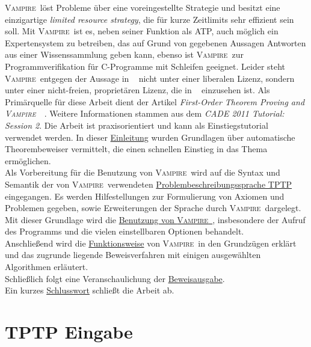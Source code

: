 \documentclass{article}
\newcommand{\vampire}{\textsc{Vampire}~}
\begin{document}
\vampire löst Probleme über eine voreingestellte Strategie und besitzt eine einzigartige \textit{limited resource strategy}, die für kurze Zeitlimits sehr effizient sein soll. Mit \vampire ist es, neben seiner Funktion als ATP, auch möglich ein Expertensystem zu betreiben, das auf Grund von gegebenen Aussagen Antworten aus einer Wissenssammlung geben kann, ebenso ist \vampire zur Programmverifikation für C-Programme mit Schleifen geeignet. 
Leider steht \vampire entgegen der Aussage in ~\cite{cav2013} nicht unter einer liberalen Lizenz, sondern unter einer nicht-freien, proprietären Lizenz, die in ~\cite{vampirehp} einzusehen ist.
Als Primärquelle für diese Arbeit dient der Artikel \textit{First-Order Theorem Proving and \vampire}~\cite{cav2013}.
Weitere Informationen stammen aus dem \textit{CADE 2011 Tutorial: Session 2}.
Die Arbeit ist praxisorientiert und kann als Einstiegstutorial verwendet werden.
In dieser \hyperref[sec:introduction]{Einleitung} wurden Grundlagen über automatische Theorembeweiser vermittelt, die einen schnellen Einstieg in das Thema ermöglichen.\\
Als Vorbereitung für die Benutzung von \vampire wird auf die Syntax und Semantik der von \vampire verwendeten \hyperref[sec:input]{Problembeschreibungssprache TPTP} eingegangen. Es werden Hilfestellungen zur Formulierung von Axiomen und Problemen gegeben, sowie Erweiterungen der Sprache durch \vampire dargelegt.
Mit dieser Grundlage wird die \hyperref[sec:invocation]{Benutzung von \vampire}, insbesondere der Aufruf des Programms und die vielen einstellbaren Optionen behandelt.\\
Anschließend wird die \hyperref[sec:mechanics]{Funktionsweise} von \vampire in den Grundzügen erklärt und das zugrunde liegende Beweisverfahren mit einigen ausgewählten Algorithmen erläutert.\\
Schließlich folgt eine Veranschaulichung der \hyperref[sec:output]{Beweisausgabe}. \\
Ein kurzes \hyperref[sec:conclusion]{Schlusswort} schließt die Arbeit ab.



\section{TPTP Eingabe}
\label{sec:input}
\end{document}

